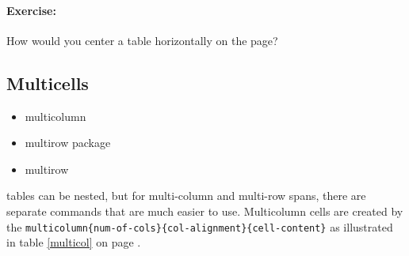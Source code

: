         \paragraph{Exercise:} How would you center a table horizontally on the page?



        \subsection{Multicells}
        \label{Multicells}
        
        \begin{framed}
            \begin{itemize}
                \item{multicolumn}
                \item{multirow package}
                \item{multirow}
            \end{itemize}
        \end{framed}

        \Lx{} tables can be nested, but for multi-column and multi-row spans, there are separate commands that are much easier to use. Multicolumn cells are created by the \texttt{multicolumn\{num-of-cols\}\{col-alignment\}\{cell-content\}} as illustrated in table \ref{multicol} on page \pageref{multicol}.

